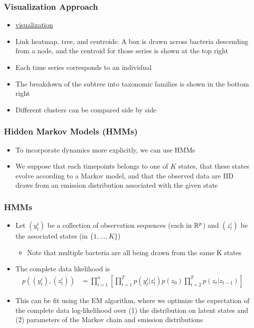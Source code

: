 \documentclass{beamer}
\begin{document}
\begin{frame}
  \frametitle{Visualization Approach}
  \begin{itemize}
  \item \href{/Users/krissankaran/Desktop/100_days/july3/hclust.html}{visualization}
  \item Link heatmap, tree, and centroids: A box is drawn across bacteria
    descending from a node, and the centroid for those series is shown at the
    top right
  \item Each time series corresponds to an individual
  \item The breakdown of the subtree into taxonomic families is shown in the
    bottom right
  \item Different clusters can be compared side by side
  \end{itemize} 
\end{frame}

\begin{frame}
  \frametitle{Hidden Markov Models (HMMs)}
  \begin{itemize}
  \item To incorporate dynamics more explicitly, we can use HMMs
  \item We suppose that each timepoints belongs to one of $K$ states, that these
    states evolve according to a Markov model, and that the observed data are IID
    draws from an emission distribution associated with the given state
  \end{itemize}
\end{frame}

\begin{frame}
  \frametitle{HMMs}
\begin{itemize}
\item Let $\left(y_{t}^{i}\right)$ be a collection of observation sequences
  (each in $\mathbb{R}^{p}$) and $\left(z_{t}^{i}\right)$ be the associated states
  (in $\{1, \dots, K\}$)
  \begin{itemize}
  \item Note that multiple bacteria are all being drawn from the same K states
  \end{itemize}
\item The complete data likelihood is
  \begin{align*}
    p\left(\left(y_{t}^{i}\right), \left(z_{t}^{i}\right)\right) &= \prod_{i = 1}^{n} \left[\prod_{t = 1}^{T} p\left(y_{t}^{i} \vert z_{t}^{i}\right) p\left(z_{0}\right)\prod_{t = 2}^{T} p\left(z_{t} \vert z_{t - 1}\right)\right]
  \end{align*}
\item This can be fit using the EM algorithm, where we optimize the expectation
  of the complete data log-likelihood over (1) the distribution on latent states
  and (2) parameters of the Markov chain and emission distributions
\end{itemize}  
\end{frame}
\end{document}
